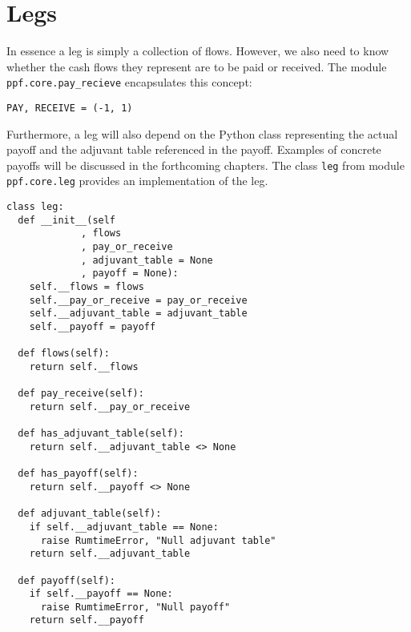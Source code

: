 \section{Legs}\label{sec:legs}
In essence a leg is simply a collection of flows. However, we also
need to know whether the cash flows they represent are to be paid or
received. The module \verb|ppf.core.pay_recieve| encapsulates this
concept:
\begin{verbatim}
PAY, RECEIVE = (-1, 1)
\end{verbatim}
Furthermore, a leg will also depend on the Python class representing the actual payoff and 
the adjuvant table referenced in the payoff. Examples of concrete payoffs will be discussed in 
the forthcoming chapters. The class \verb|leg| from module \verb|ppf.core.leg| provides an 
implementation of the leg.
\begin{verbatim}
class leg:
  def __init__(self
             , flows
             , pay_or_receive
             , adjuvant_table = None
             , payoff = None):
    self.__flows = flows
    self.__pay_or_receive = pay_or_receive
    self.__adjuvant_table = adjuvant_table
    self.__payoff = payoff

  def flows(self):
    return self.__flows

  def pay_receive(self):
    return self.__pay_or_receive

  def has_adjuvant_table(self):
    return self.__adjuvant_table <> None

  def has_payoff(self):
    return self.__payoff <> None

  def adjuvant_table(self):
    if self.__adjuvant_table == None:
      raise RumtimeError, "Null adjuvant table"
    return self.__adjuvant_table

  def payoff(self):
    if self.__payoff == None:
      raise RumtimeError, "Null payoff"
    return self.__payoff
\end{verbatim}

